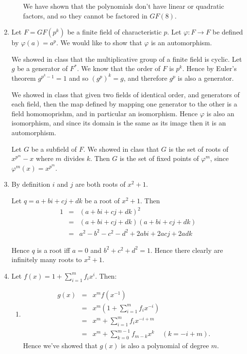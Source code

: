\documentclass[11pt]{article} \usepackage{amssymb}
\renewcommand{\phi}{\varphi}
\begin{document}
\begin{enumerate}
\begin{enumerate}
    We have shown that the polynomials don't have linear or quadratic factors,
    and so they cannot be factored in $GF(8)$.
  \end{enumerate}
\item

  Let $F=GF(p^k)$ be a finite field of characteristic $p$. 
  Let $\phi:F\to F$ be defined
  by $\phi(a)=a^p$. We would like to show that $\phi$ is an automorphism. 


  We showed in class that the multiplicative group of a 
  finite field is cyclic. Let $g$ be a generator of $F^*$.
  We know that the order of $F$ is $p^k$. 
  Hence by Euler's theorem $g^{p^k-1}=1$ and so $\left(g^p\right)^k=g$, and 
  therefore $g^p$ is also a generator. 

  We showed in class that given two fields of identical order, and generators
  of each field, then the map defined by mapping one generator to the
  other is a field homomoprishm, and in particular an isomorphism. 
  Hence $\phi$ is also an isomorphism, and since
  its domain is the same as its image then it is an automorphism.

  Let $G$ be a subfield of $F$. We showed in class that $G$ is the set of
  roots of $x^{p^m}-x$ where $m$ divides $k$. Then $G$ is the set of
  fixed points of $\phi^m$, since $\phi^m(x)=x^{p^m}$.

\item

  By definition $i$ and $j$ are both roots of $x^2+1$. 

  Let $q=a+bi+cj+dk$ be a root of $x^2+1$. Then
  \begin{eqnarray*}
    1 &=&(a+bi+cj+dk)^2
    \\ &=&(a+bi+cj+dk)(a+bi+cj+dk)
    \\ &=&a^2-b^2-c^2-d^2+2abi+2acj+2adk
  \end{eqnarray*}

  Hence $q$ is a root iff $a=0$ and $b^2+c^2+d^2=1$. Hence there clearly are
  infinitely many roots to $x^2+1$.

\item
  Let $f(x)=1+\sum_{i=1}^mf_ix^i$. Then:
  \begin{enumerate}
  \item 
    \begin{eqnarray*}
      g(x)&=&x^mf(x^{-1})
      \\ &=& x^m\left(1+\sum_{i=1}^mf_ix^{-i}\right)
      \\ &=& x^m+\sum_{i=1}^mf_ix^{-i+m}
      \\ &=& x^m+\sum_{k=0}^{m-1}f_{m-k}x^k \;\;\;\; (k=-i+m).
    \end{eqnarray*}
    Hence we've showed that $g(x)$ is also a polynomial of degree $m$.


\end{enumerate}
\end{enumerate}
\end{document}
